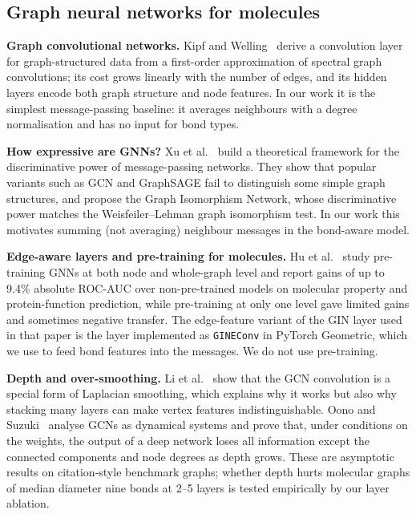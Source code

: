 \subsection{Graph neural networks for molecules}
\label{sec:related-gnn}
\textbf{Graph convolutional networks.} Kipf and Welling~\cite{kipf2017gcn} derive a convolution layer for graph-structured data from a first-order approximation of spectral graph convolutions; its cost grows linearly with the number of edges, and its hidden layers encode both graph structure and node features. In our work it is the simplest message-passing baseline: it averages neighbours with a degree normalisation and has no input for bond types.

\textbf{How expressive are GNNs?} Xu et al.~\cite{xu2019gin} build a theoretical framework for the discriminative power of message-passing networks. They show that popular variants such as GCN and GraphSAGE fail to distinguish some simple graph structures, and propose the Graph Isomorphism Network, whose discriminative power matches the Weisfeiler--Lehman graph isomorphism test. In our work this motivates summing (not averaging) neighbour messages in the bond-aware model.

\textbf{Edge-aware layers and pre-training for molecules.} Hu et al.~\cite{hu2020pretrain} study pre-training GNNs at both node and whole-graph level and report gains of up to 9.4\% absolute ROC-AUC over non-pre-trained models on molecular property and protein-function prediction, while pre-training at only one level gave limited gains and sometimes negative transfer. The edge-feature variant of the GIN layer used in that paper is the layer implemented as \texttt{GINEConv} in PyTorch Geometric, which we use to feed bond features into the messages. We do not use pre-training.

\textbf{Depth and over-smoothing.} Li et al.~\cite{li2018oversmooth} show that the GCN convolution is a special form of Laplacian smoothing, which explains why it works but also why stacking many layers can make vertex features indistinguishable. Oono and Suzuki~\cite{oono2020expressive} analyse GCNs as dynamical systems and prove that, under conditions on the weights, the output of a deep network loses all information except the connected components and node degrees as depth grows. These are asymptotic results on citation-style benchmark graphs; whether depth hurts molecular graphs of median diameter nine bonds at 2--5 layers is tested empirically by our layer ablation.

